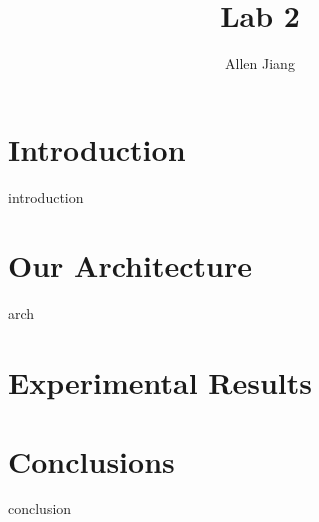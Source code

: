 \documentclass[sigplan,screen]{acmart}
\begin{document}
\title{Lab 2}



\author{Allen Jiang}

\date{}  %



\maketitle

\section{Introduction}
\label{sec:intro}
 {introduction}


\section{Our Architecture}
\label{sec:arch}
 {arch}

\section{Experimental Results}
\label{sec:results}


\section{Conclusions}
\label{sec:conclusion}
 {conclusion}
\end{document}
